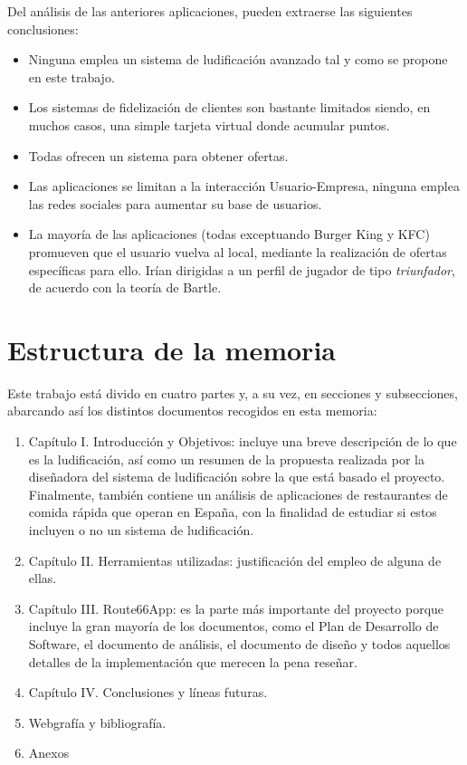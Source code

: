 \documentclass[twoside]{report}
\begin{document}
Del análisis de las anteriores aplicaciones, pueden extraerse las siguientes conclusiones:
\begin{itemize}

\item Ninguna emplea un sistema de ludificación avanzado tal y como se propone en este trabajo.

\item Los sistemas de fidelización de clientes son bastante limitados siendo, en muchos casos, una simple tarjeta virtual donde acumular puntos.

\item Todas ofrecen un sistema para obtener ofertas.

\item Las aplicaciones se limitan a la interacción Usuario-Empresa, ninguna emplea las redes sociales para aumentar su base de usuarios.

\item La mayoría de las aplicaciones (todas exceptuando Burger King y KFC) promueven que el usuario vuelva al local, mediante la realización de ofertas específicas para ello. Irían dirigidas a un perfil de jugador de tipo \textit{triunfador}, de acuerdo con la \cite{iebsctj} teoría de Bartle.
\end{itemize}

\section{Estructura de la memoria}

Este trabajo está divido en cuatro partes y, a su vez, en secciones y subsecciones, abarcando así los distintos documentos recogidos en esta memoria:

\begin{enumerate}
\item Capítulo I. Introducción y Objetivos: incluye una breve descripción de lo que es la ludificación, así como un resumen de la propuesta realizada por la diseñadora del sistema de ludificación sobre la que está basado el proyecto. Finalmente, también contiene un análisis de aplicaciones de restaurantes de comida rápida que operan en España, con la finalidad de estudiar si estos incluyen o no un sistema de ludificación.

\item Capítulo II. Herramientas utilizadas: justificación del empleo de alguna de ellas. 

\item Capítulo III. Route66App: es la parte más importante del proyecto porque incluye la gran mayoría de los documentos, como el Plan de Desarrollo de Software, el documento de análisis, el documento de diseño y todos aquellos detalles de la implementación que merecen la pena reseñar.

\item Capítulo IV. Conclusiones y líneas futuras.

\item Webgrafía y bibliografía.

\item Anexos

\end{enumerate}
\end{document}
